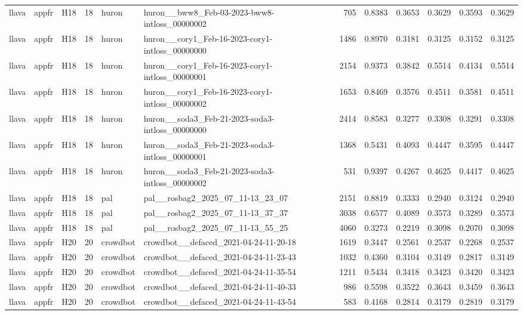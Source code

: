 \begin{table}[tbp]
\begin{tabular}{lllrllrrrrrr}
llava & appfr & H18 & 18 & huron & huron\_\_bww8\_Feb-03-2023-bww8-intloss\_00000002 & 705 & 0.8383 & 0.3653 & 0.3629 & 0.3593 & 0.3629 \\
llava & appfr & H18 & 18 & huron & huron\_\_cory1\_Feb-16-2023-cory1-intloss\_00000000 & 1486 & 0.8970 & 0.3181 & 0.3125 & 0.3152 & 0.3125 \\
llava & appfr & H18 & 18 & huron & huron\_\_cory1\_Feb-16-2023-cory1-intloss\_00000001 & 2154 & 0.9373 & 0.3842 & 0.5514 & 0.4134 & 0.5514 \\
llava & appfr & H18 & 18 & huron & huron\_\_cory1\_Feb-16-2023-cory1-intloss\_00000002 & 1653 & 0.8469 & 0.3576 & 0.4511 & 0.3581 & 0.4511 \\
llava & appfr & H18 & 18 & huron & huron\_\_soda3\_Feb-21-2023-soda3-intloss\_00000000 & 2414 & 0.8583 & 0.3277 & 0.3308 & 0.3291 & 0.3308 \\
llava & appfr & H18 & 18 & huron & huron\_\_soda3\_Feb-21-2023-soda3-intloss\_00000001 & 1368 & 0.5431 & 0.4093 & 0.4447 & 0.3595 & 0.4447 \\
llava & appfr & H18 & 18 & huron & huron\_\_soda3\_Feb-21-2023-soda3-intloss\_00000002 & 531 & 0.9397 & 0.4267 & 0.4625 & 0.4417 & 0.4625 \\
llava & appfr & H18 & 18 & pal & pal\_\_rosbag2\_2025\_07\_11-13\_23\_07 & 2151 & 0.8819 & 0.3333 & 0.2940 & 0.3124 & 0.2940 \\
llava & appfr & H18 & 18 & pal & pal\_\_rosbag2\_2025\_07\_11-13\_37\_37 & 3038 & 0.6577 & 0.4089 & 0.3573 & 0.3289 & 0.3573 \\
llava & appfr & H18 & 18 & pal & pal\_\_rosbag2\_2025\_07\_11-13\_55\_25 & 4060 & 0.3273 & 0.2219 & 0.3098 & 0.2070 & 0.3098 \\
llava & appfr & H20 & 20 & crowdbot & crowdbot\_\_defaced\_2021-04-24-11-20-18 & 1619 & 0.3447 & 0.2561 & 0.2537 & 0.2268 & 0.2537 \\
llava & appfr & H20 & 20 & crowdbot & crowdbot\_\_defaced\_2021-04-24-11-23-43 & 1032 & 0.4360 & 0.3104 & 0.3149 & 0.2817 & 0.3149 \\
llava & appfr & H20 & 20 & crowdbot & crowdbot\_\_defaced\_2021-04-24-11-35-54 & 1211 & 0.5434 & 0.3418 & 0.3423 & 0.3420 & 0.3423 \\
llava & appfr & H20 & 20 & crowdbot & crowdbot\_\_defaced\_2021-04-24-11-40-33 & 986 & 0.5598 & 0.3522 & 0.3643 & 0.3459 & 0.3643 \\
llava & appfr & H20 & 20 & crowdbot & crowdbot\_\_defaced\_2021-04-24-11-43-54 & 583 & 0.4168 & 0.2814 & 0.3179 & 0.2819 & 0.3179 \\

\end{tabular}
\end{table}

